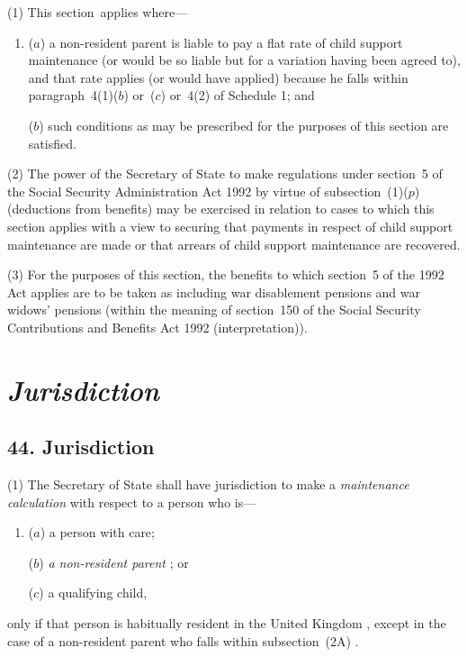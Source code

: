 \documentclass[12pt,a4paper]{article}
\begin{document}
(1) This section~applies where—
\begin{enumerate}\item[]
($a$) a non-resident parent is liable to pay a flat rate of child support maintenance (or would be so liable but for a variation having been agreed to), and that rate applies (or would have applied) because he falls within paragraph~4(1)($b$)  or~($c$)  or~4(2)  of Schedule 1; and

($b$) such conditions as may be prescribed for the purposes of this section are satisfied.
\end{enumerate}

(2) The power of the Secretary of State to make regulations under section~5 of the Social Security Administration Act 1992 by virtue of subsection~(1)($p$)  (deductions from benefits) may be exercised in relation to cases to which this section applies with a view to securing that payments in respect of child support maintenance are made or that arrears of child support maintenance are recovered.

(3) For the purposes of this section, the benefits to which section~5 of the 1992 Act applies are to be taken as including war disablement pensions and war widows' pensions (within the meaning of section~150 of the Social Security Contributions and Benefits Act 1992 (interpretation)).


\section{\itshape Jurisdiction}

\subsection{44. Jurisdiction}

(1) 
The Secretary of State  %
shall have jurisdiction to make a 
\emph{maintenance calculation}  %
with respect to a person who is—
\begin{enumerate}\item[]
($a$) a person with care;

($b$) 
\emph{a non-resident parent}%
; or

($c$) a qualifying child,
\end{enumerate}
only if that person is habitually resident in the United Kingdom%
, except in the case of a non-resident parent who falls within subsection~(2A)%
.
\end{document}

